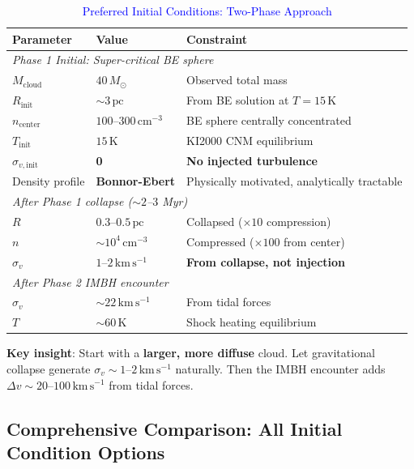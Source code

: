 \documentclass[11pt,a4paper]{article}
\newcommand{\Msun}{M_\odot}
\newcommand{\kms}{\,\mathrm{km\,s^{-1}}}
\newcommand{\pc}{\,\mathrm{pc}}
\newcommand{\cmcubed}{\,\mathrm{cm^{-3}}}
\begin{document}
\begin{table}[h]
\centering
\caption{\textcolor{blue}{Preferred Initial Conditions: Two-Phase Approach}}
\small
\begin{tabular}{lll}
\toprule
\textbf{Parameter} & \textbf{Value} & \textbf{Constraint} \\
\midrule
\multicolumn{3}{l}{\textit{Phase 1 Initial: Super-critical BE sphere}} \\
$M_\mathrm{cloud}$ & $40\,\Msun$ & Observed total mass \\
$R_\mathrm{init}$ & $\sim 3\pc$ & From BE solution at $T = 15\,\mathrm{K}$ \\
$n_\mathrm{center}$ & $100$--$300\cmcubed$ & BE sphere centrally concentrated \\
$T_\mathrm{init}$ & $15\,\mathrm{K}$ & KI2000 CNM equilibrium \\
$\sigma_{v,\mathrm{init}}$ & \textbf{0} & \textbf{No injected turbulence} \\
Density profile & \textbf{Bonnor-Ebert} & Physically motivated, analytically tractable \\
\midrule
\multicolumn{3}{l}{\textit{After Phase 1 collapse ($\sim 2$--$3$ Myr)}} \\
$R$ & $0.3$--$0.5\pc$ & Collapsed ($\times 10$ compression) \\
$n$ & $\sim 10^4\cmcubed$ & Compressed ($\times 100$ from center) \\
$\sigma_v$ & $1$--$2\kms$ & \textbf{From collapse, not injection} \\
\midrule
\multicolumn{3}{l}{\textit{After Phase 2 IMBH encounter}} \\
$\sigma_v$ & $\sim 22\kms$ & From tidal forces \\
$T$ & $\sim 60\,\mathrm{K}$ & Shock heating equilibrium \\
\bottomrule
\end{tabular}
\end{table}

\textbf{Key insight}: Start with a \textbf{larger, more diffuse} cloud. Let
gravitational collapse generate $\sigma_v \sim 1$--$2\kms$ naturally. Then
the IMBH encounter adds $\Delta v \sim 20$--$100\kms$ from tidal forces.

\subsection{Comprehensive Comparison: All Initial Condition Options}
\end{document}
